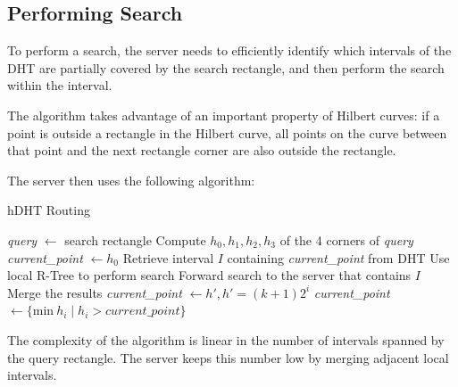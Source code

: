 \subsection{Performing Search}
To perform a search, the server needs to efficiently identify which intervals of the DHT are partially covered by the search rectangle, and then perform the search within the interval.

The algorithm takes advantage of an important property of Hilbert curves: if a point is outside a rectangle in the Hilbert curve, all points on the curve between that point and the next rectangle corner are also outside the rectangle.

The server then uses the following algorithm:
\begin{algorithm}[H]
  \caption{hDHT Routing}
  \begin{algorithmic}[1]
  	\State \textit{query} $\gets$ search rectangle
  	\State Compute $h_0, h_1, h_2, h_3$ of the 4 corners of \textit{query} 
    \State \textit{current\_point} $\gets h_0$
     		\State Retrieve interval $I$ containing \textit{current\_point} from DHT
     			\State Use local R-Tree to perform search
     		\Else
     			\State Forward search to the server that contains $I$
     			\State Merge the results
     		\EndIf
     		\State \textit{current\_point} $\gets h', h' = (k+1) 2^i$ 
     	\Else
     		\State \textit{current\_point} $\gets \{\text{min}\ h_i \mid h_i > \textit{current\_point} \}$ 
     	\EndIf
    \EndWhile
  \end{algorithmic}
\end{algorithm}

The complexity of the algorithm is linear in the number of intervals spanned by the query rectangle.
The server keeps this number low by merging adjacent local intervals.

